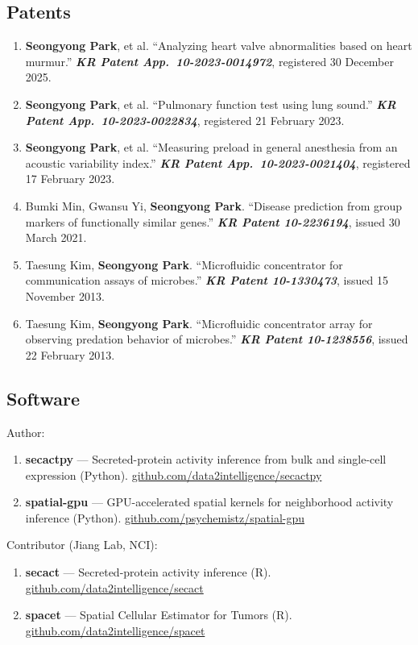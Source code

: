 \begin{scriptsize}
\subsection*{Patents}
\begin{enumerate}
    \item \textbf{Seongyong Park}, et al. ``Analyzing heart valve abnormalities based on heart murmur.'' \textit{\textbf{KR Patent App.\ 10-2023-0014972}}, registered 30 December 2025.
    \item \textbf{Seongyong Park}, et al. ``Pulmonary function test using lung sound.'' \textit{\textbf{KR Patent App.\ 10-2023-0022834}}, registered 21 February 2023.
    \item \textbf{Seongyong Park}, et al. ``Measuring preload in general anesthesia from an acoustic variability index.'' \textit{\textbf{KR Patent App.\ 10-2023-0021404}}, registered 17 February 2023.
    \item Bumki Min, Gwansu Yi, \textbf{Seongyong Park}. ``Disease prediction from group markers of functionally similar genes.'' \textit{\textbf{KR Patent 10-2236194}}, issued 30 March 2021.
    \item Taesung Kim, \textbf{Seongyong Park}. ``Microfluidic concentrator for communication assays of microbes.'' \textit{\textbf{KR Patent 10-1330473}}, issued 15 November 2013.
    \item Taesung Kim, \textbf{Seongyong Park}. ``Microfluidic concentrator array for observing predation behavior of microbes.'' \textit{\textbf{KR Patent 10-1238556}}, issued 22 February 2013.
\end{enumerate}

\subsection*{Software}
Author:
\begin{enumerate}
    \item \textbf{secactpy} --- Secreted-protein activity inference from bulk and single-cell expression (Python). \href{https://github.com/data2intelligence/secactpy}{github.com/data2intelligence/secactpy}
    \item \textbf{spatial-gpu} --- GPU-accelerated spatial kernels for neighborhood activity inference (Python). \href{https://github.com/psychemistz/spatial-gpu}{github.com/psychemistz/spatial-gpu}
\end{enumerate}

Contributor (Jiang Lab, NCI):
\begin{enumerate}
    \item \textbf{secact} --- Secreted-protein activity inference (R). \href{https://github.com/data2intelligence/secact}{github.com/data2intelligence/secact}
    \item \textbf{spacet} --- Spatial Cellular Estimator for Tumors (R). \href{https://github.com/data2intelligence/spacet}{github.com/data2intelligence/spacet}
\end{enumerate}

\end{scriptsize}
